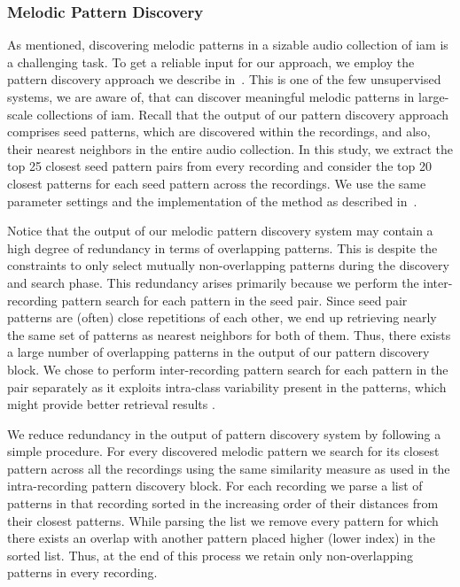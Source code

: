 {\subsubsection{Melodic Pattern Discovery}
\label{sec:patterns_characterization_pattern_discovery}

As mentioned, discovering melodic patterns in a sizable audio collection of \gls{iam} is a challenging task. To get a reliable input for our approach, we employ the pattern discovery approach we describe in~. This is one of the few unsupervised systems, we are aware of, that can discover meaningful melodic patterns in large-scale collections of \gls{iam}. Recall that the output of our pattern discovery approach comprises seed patterns, which are discovered within the recordings, and also, their nearest neighbors in the entire audio collection. In this study, we extract the top 25 closest seed pattern pairs from every recording and consider the top 20 closest patterns for each seed pattern across the recordings. We use the same parameter settings and the implementation of the method as described in~. 

Notice that the output of our melodic pattern discovery system may contain a high degree of redundancy in terms of overlapping patterns. This is despite the constraints to only select mutually non-overlapping patterns during the discovery and search phase. This redundancy arises primarily because we perform the inter-recording pattern search for each pattern in the seed pair. Since seed pair patterns are (often) close repetitions of each other, we end up retrieving nearly the same set of patterns as nearest neighbors for both of them. Thus, there exists a large number of overlapping patterns in the output of our pattern discovery block. We chose to perform inter-recording pattern search for each pattern in the pair separately as it exploits intra-class variability present in the patterns, which might provide better retrieval results . 

We reduce redundancy in the output of pattern discovery system by following a simple procedure. For every discovered melodic pattern we search for its closest pattern across all the recordings using the same similarity measure as used in the intra-recording pattern discovery block. For each recording we parse a list of patterns in that recording sorted in the increasing order of their distances from their closest patterns. While parsing the list we remove every pattern for which there exists an overlap with another pattern placed higher (lower index) in the sorted list. Thus, at the end of this process we retain only non-overlapping patterns in every recording.



}
